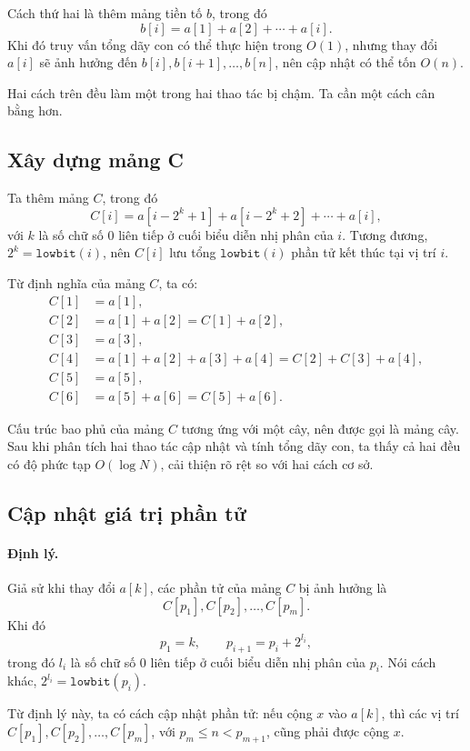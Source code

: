 \documentclass[11pt]{article}
\begin{document}
Cách thứ hai là thêm mảng tiền tố \(b\), trong đó
\[
  b[i]=a[1]+a[2]+\cdots+a[i].
\]
Khi đó truy vấn tổng dãy con có thể thực hiện trong \(O(1)\), nhưng thay đổi
\(a[i]\) sẽ ảnh hưởng đến \(b[i],b[i+1],\ldots,b[n]\), nên cập nhật có thể
tốn \(O(n)\).

Hai cách trên đều làm một trong hai thao tác bị chậm. Ta cần một cách cân
bằng hơn.

\subsection{Xây dựng mảng C}

Ta thêm mảng \(C\), trong đó
\[
  C[i]=a[i-2^k+1]+a[i-2^k+2]+\cdots+a[i],
\]
với \(k\) là số chữ số \(0\) liên tiếp ở cuối biểu diễn nhị phân của \(i\).
Tương đương, \(2^k=\texttt{lowbit}(i)\), nên \(C[i]\) lưu tổng
\(\texttt{lowbit}(i)\) phần tử kết thúc tại vị trí \(i\).

Từ định nghĩa của mảng \(C\), ta có:
\[
\begin{aligned}
C[1]&=a[1],\\
C[2]&=a[1]+a[2]=C[1]+a[2],\\
C[3]&=a[3],\\
C[4]&=a[1]+a[2]+a[3]+a[4]=C[2]+C[3]+a[4],\\
C[5]&=a[5],\\
C[6]&=a[5]+a[6]=C[5]+a[6].
\end{aligned}
\]

Cấu trúc bao phủ của mảng \(C\) tương ứng với một cây, nên được gọi là mảng
cây. Sau khi phân tích hai thao tác cập nhật và tính tổng dãy con, ta thấy
cả hai đều có độ phức tạp \(O(\log N)\), cải thiện rõ rệt so với hai cách cơ
sở.

\subsection{Cập nhật giá trị phần tử}

\paragraph{Định lý.}
Giả sử khi thay đổi \(a[k]\), các phần tử của mảng \(C\) bị ảnh hưởng là
\[
  C[p_1], C[p_2], \ldots, C[p_m].
\]
Khi đó
\[
  p_1=k,\qquad p_{i+1}=p_i+2^{l_i},
\]
trong đó \(l_i\) là số chữ số \(0\) liên tiếp ở cuối biểu diễn nhị phân của
\(p_i\). Nói cách khác, \(2^{l_i}=\texttt{lowbit}(p_i)\).

Từ định lý này, ta có cách cập nhật phần tử: nếu cộng \(x\) vào \(a[k]\), thì
các vị trí \(C[p_1],C[p_2],\ldots,C[p_m]\), với \(p_m\le n<p_{m+1}\), cũng
phải được cộng \(x\).
\end{document}
